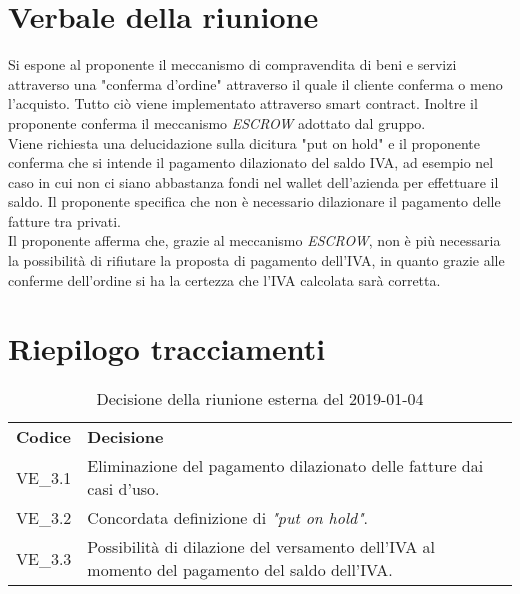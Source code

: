 \section{Verbale della riunione}
Si espone al proponente il meccanismo di compravendita di beni e servizi attraverso
una "conferma d'ordine" attraverso il quale il cliente conferma o meno l'acquisto.
Tutto ciò viene implementato attraverso smart contract\glo{}. Inoltre il proponente
conferma il meccanismo \textit{ESCROW\glo{}} adottato dal gruppo. \\
Viene richiesta una delucidazione sulla dicitura "put on hold" e il proponente conferma
che si intende il pagamento dilazionato del saldo IVA, ad esempio nel caso in cui non 
ci siano abbastanza fondi nel wallet\glo{} dell'azienda per effettuare il saldo. 
Il proponente specifica che non è necessario dilazionare il pagamento delle fatture 
tra privati. \\
Il proponente afferma che, grazie al meccanismo \textit{ESCROW\glo{}}, non è più necessaria
la possibilità di rifiutare la proposta di pagamento dell'IVA, in quanto grazie alle 
conferme dell'ordine si ha la certezza che l'IVA calcolata sarà corretta.

\pagebreak

\section{Riepilogo tracciamenti}
\begin{table}[H]
	
	\begin{longtable}{ >{\centering}p{} >{\centering}p{}}
			
		\rowcolorhead
		\centering \textbf{\color{white}Codice} 
		& \centering \textbf{\color{white}Decisione} 
		
		\tabularnewline 
		VE\_3.1 & Eliminazione del pagamento dilazionato delle fatture dai casi d'uso.
		
		\tabularnewline 
		VE\_3.2 & Concordata definizione di \textit{"put on hold"}.
		
		\tabularnewline 
		VE\_3.3 & Possibilità di dilazione del versamento dell'IVA al momento del 
						pagamento del saldo dell'IVA.

		
	\end{longtable}
	\caption{Decisione della riunione esterna del 2019-01-04}	

\end{table}

